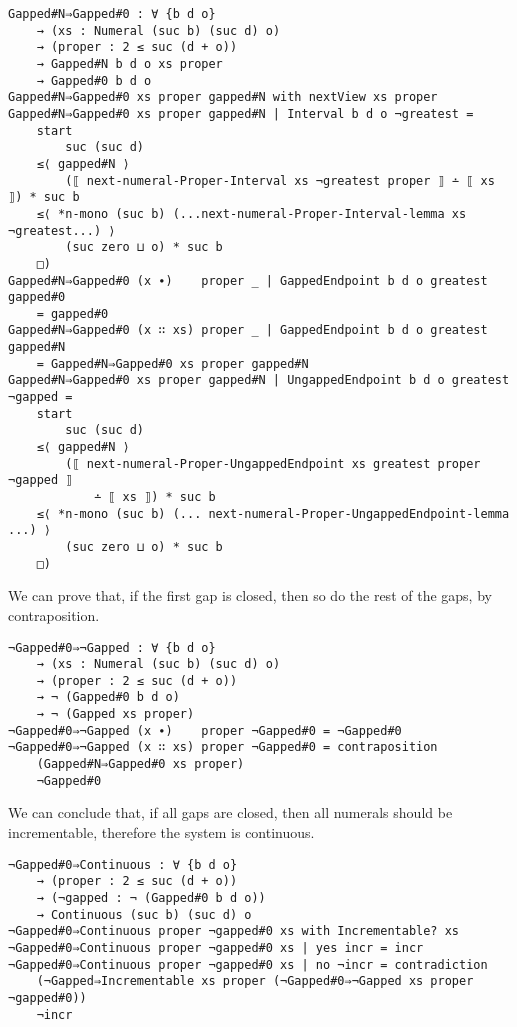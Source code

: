 \documentclass[\main/thesis.tex]{subfiles}
\begin{document}
\begin{lstlisting}[basicstyle=\ttfamily\scriptsize]
Gapped#N⇒Gapped#0 : ∀ {b d o}
    → (xs : Numeral (suc b) (suc d) o)
    → (proper : 2 ≤ suc (d + o))
    → Gapped#N b d o xs proper
    → Gapped#0 b d o
Gapped#N⇒Gapped#0 xs proper gapped#N with nextView xs proper
Gapped#N⇒Gapped#0 xs proper gapped#N | Interval b d o ¬greatest =
    start
        suc (suc d)
    ≤⟨ gapped#N ⟩
        (⟦ next-numeral-Proper-Interval xs ¬greatest proper ⟧ ∸ ⟦ xs ⟧) * suc b
    ≤⟨ *n-mono (suc b) (...next-numeral-Proper-Interval-lemma xs ¬greatest...) ⟩
        (suc zero ⊔ o) * suc b
    □)
Gapped#N⇒Gapped#0 (x ∙)    proper _ | GappedEndpoint b d o greatest gapped#0
    = gapped#0
Gapped#N⇒Gapped#0 (x ∷ xs) proper _ | GappedEndpoint b d o greatest gapped#N
    = Gapped#N⇒Gapped#0 xs proper gapped#N
Gapped#N⇒Gapped#0 xs proper gapped#N | UngappedEndpoint b d o greatest ¬gapped =
    start
        suc (suc d)
    ≤⟨ gapped#N ⟩
        (⟦ next-numeral-Proper-UngappedEndpoint xs greatest proper ¬gapped ⟧
            ∸ ⟦ xs ⟧) * suc b
    ≤⟨ *n-mono (suc b) (... next-numeral-Proper-UngappedEndpoint-lemma ...) ⟩
        (suc zero ⊔ o) * suc b
    □)
\end{lstlisting}

We can prove that, if the first gap is closed, then so do the rest of the gaps,
by contraposition.

\begin{lstlisting}
¬Gapped#0⇒¬Gapped : ∀ {b d o}
    → (xs : Numeral (suc b) (suc d) o)
    → (proper : 2 ≤ suc (d + o))
    → ¬ (Gapped#0 b d o)
    → ¬ (Gapped xs proper)
¬Gapped#0⇒¬Gapped (x ∙)    proper ¬Gapped#0 = ¬Gapped#0
¬Gapped#0⇒¬Gapped (x ∷ xs) proper ¬Gapped#0 = contraposition
    (Gapped#N⇒Gapped#0 xs proper)
    ¬Gapped#0
\end{lstlisting}

We can conclude that, if all gaps are closed,
then all numerals should be incrementable, therefore the system is continuous.

\begin{lstlisting}[basicstyle=\ttfamily\scriptsize]
¬Gapped#0⇒Continuous : ∀ {b d o}
    → (proper : 2 ≤ suc (d + o))
    → (¬gapped : ¬ (Gapped#0 b d o))
    → Continuous (suc b) (suc d) o
¬Gapped#0⇒Continuous proper ¬gapped#0 xs with Incrementable? xs
¬Gapped#0⇒Continuous proper ¬gapped#0 xs | yes incr = incr
¬Gapped#0⇒Continuous proper ¬gapped#0 xs | no ¬incr = contradiction
    (¬Gapped⇒Incrementable xs proper (¬Gapped#0⇒¬Gapped xs proper ¬gapped#0))
    ¬incr
\end{lstlisting}
\end{document}
